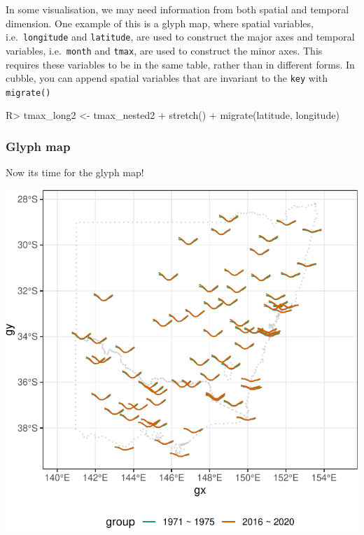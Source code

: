 \documentclass[
]{jss}
\begin{document}
In some visualisation, we may need information from both spatial and
temporal dimension. One example of this is a glyph map, where spatial
variables, i.e.~\texttt{longitude} and \texttt{latitude}, are used to
construct the major axes and temporal variables, i.e.~\texttt{month} and
\texttt{tmax}, are used to construct the minor axes. This requires these
variables to be in the same table, rather than in different forms. In
cubble, you can append spatial variables that are invariant to the
\texttt{key} with \texttt{migrate()}

\begin{CodeChunk}
\begin{CodeInput}
R> tmax_long2 <- tmax_nested2 %
+   stretch() %
+   migrate(latitude, longitude)
\end{CodeInput}
\end{CodeChunk}

\hypertarget{glyph-map}{%
\subsubsection{Glyph map}\label{glyph-map}}

Now its time for the glyph map!

\begin{CodeChunk}


\begin{center}\includegraphics{figures/unnamed-chunk-10-1} \end{center}

\end{CodeChunk}
\end{document}
